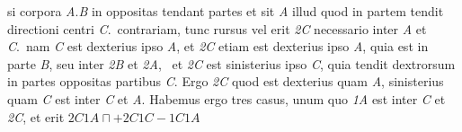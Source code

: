 {%
}
%
si corpora \textit{A}.\textit{B} in oppositas tendant partes
et sit \textit{A} illud quod in partem tendit directioni centri \textit{C}.\ contrariam, tunc rursus vel erit \textit{{\scriptsize2}C} necessario 
inter \textit{A} et \textit{C}.\ nam \textit{C} est dexterius ipso \textit{A}, et \textit{{\scriptsize2}C} etiam est dexterius ipso \textit{A}, quia est in parte \textit{B}, seu inter \textit{{\scriptsize2}B} et \textit{{\scriptsize2}A}\lbrack,\rbrack\ 
et \textit{{\scriptsize2}C} est sinisterius ipso \textit{C}, quia tendit dextrorsum in partes oppositas partibus \textit{C}. Ergo \textit{{\scriptsize2}C} quod est 
dexterius quam \textit{A}, sinisterius quam \textit{C} est inter \textit{C} et \textit{A}.%
\pend
\newpage
\pstart
\hspace{1mm}\hspace{-1mm}%
\edlabel{37_05_146-147_17a}%
Habemus ergo tres casus, unum 
%
%
%
quo
\pend
%
\pstart
\textit{{\scriptsize1}A}%
%
est inter \textit{C} et \textit{{\scriptsize2}C}, et erit ${\scriptstyle \textit{2}}C{\scriptstyle \textit{1}}A \sqcap +{\scriptstyle \textit{2}}C{\scriptstyle \textit{1}}C - {\scriptstyle \textit{1}}C{\scriptstyle \textit{1}}A$
%
%
